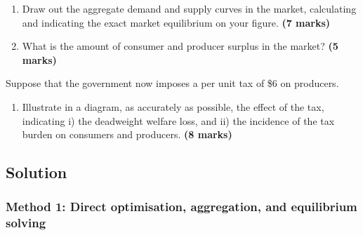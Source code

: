 \documentclass[12pt]{article}
\begin{document}
\begin{enumerate}[label=(\alph*), start=5]
    \item Draw out the aggregate demand and supply curves in the market, calculating and indicating the exact market equilibrium on your figure. \hfill \textbf{(7 marks)}
    \item What is the amount of consumer and producer surplus in the market? \hfill \textbf{(5 marks)}
\end{enumerate}

\noindent
Suppose that the government now imposes a per unit tax of \$6 on producers.

\begin{enumerate}[label=(\alph*), start=7]
    \item Illustrate in a diagram, as accurately as possible, the effect of the tax, indicating i) the deadweight welfare loss, and ii) the incidence of the tax burden on consumers and producers. \hfill \textbf{(8 marks)}
\end{enumerate}


\newpage
\subsection{Solution}

\subsubsection{Method 1: Direct optimisation, aggregation, and equilibrium solving}
\end{document}
